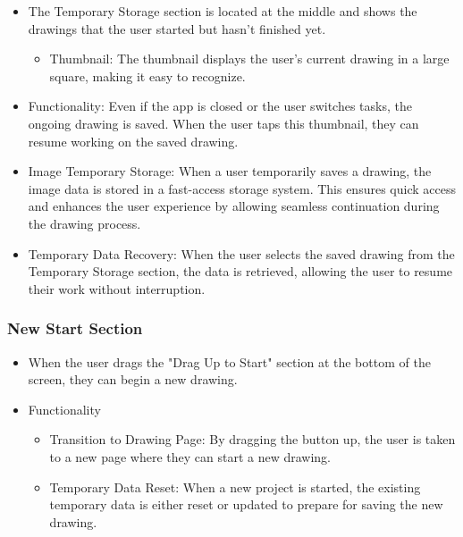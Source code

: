\documentclass[conference]{IEEEtran}
\begin{document}
\begin{itemize}
    \item The Temporary Storage section is located at the middle and shows the drawings that the user started but hasn't finished yet.
\begin{itemize}
    \item Thumbnail: The thumbnail displays the user’s current drawing in a large square, making it easy to recognize.\\
\end{itemize}
    \item Functionality: Even if the app is closed or the user switches tasks, the ongoing drawing is saved. When the user taps this thumbnail, they can resume working on the saved drawing.\\
    \item Image Temporary Storage: When a user temporarily saves a drawing, the image data is stored in a fast-access storage system. This ensures quick access and enhances the user experience by allowing seamless continuation during the drawing process.\\
    \item Temporary Data Recovery: When the user selects the saved drawing from the Temporary Storage section, the data is retrieved, allowing the user to resume their work without interruption.\\

\end{itemize}

\subsubsection{New Start Section}

\begin{itemize}
    \item When the user drags the "Drag Up to Start" section at the bottom of the screen, they can begin a new drawing.\\
    \item Functionality 
\begin{itemize}
    \item Transition to Drawing Page: By dragging the button up, the user is taken to a new page where they can start a new drawing.\\
    \item Temporary Data Reset: When a new project is started, the existing temporary data is either reset or updated to prepare for saving the new drawing.\\

\end{itemize}
\end{itemize}    
\end{document}
